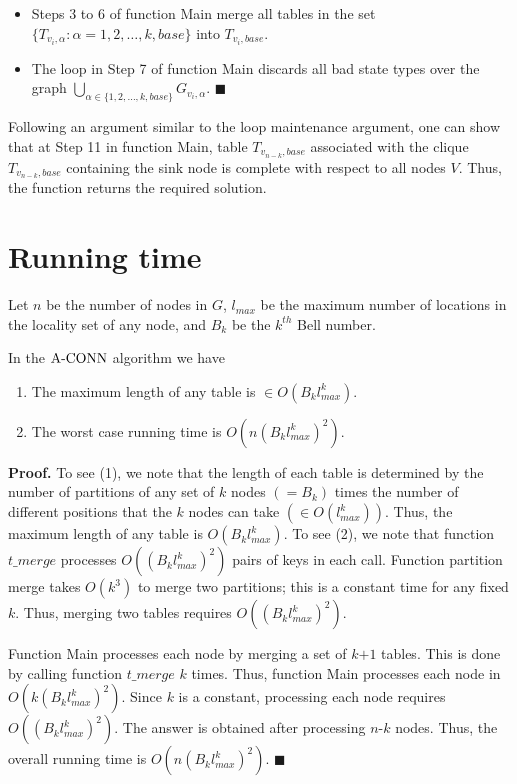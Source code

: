 \begin{itemize}
\item Steps 3 to 6 of function Main merge all tables in the set $\{ T_{v_i,\alpha}:\alpha=1, 2, \ldots, k, base \}$ into $T_{v_i,base}$.
\item The loop in Step 7 of function Main discards all bad state types over the graph $\displaystyle \bigcup_{\alpha\in  \{1, 2, \ldots, k, base\}} G_{v_i,\alpha}$. $\blacksquare$
\end{itemize}

%
Following an argument similar to the loop maintenance argument, one can show that at Step 11 in function Main, table $T_{v_{n-k},base}$ associated with the clique $T_{v_{n-k},base}$ containing the sink node is complete with respect to all nodes $V$.
%
Thus, the function returns the required solution.
\section{Running time}
\label{sec:runtym}
Let $n$ be the number of nodes in $G$, $l_{max}$ be the maximum number of locations in the locality set of any node, and $B_k$ be the $k^{th}$ Bell number.
\nwline 
\begin{theorem}\label{thm:runtym}
\normalfont
In the ${\mathrm {A\mbox{-}CONN}}$ algorithm we have
\begin{enumerate}[noitemsep]
\item The maximum length of any table is $\in O(B_k l_{max}^k)$.
\item The worst case running time is $O(n(B_k l_{max}^k)^2)$.
\end{enumerate}
\end{theorem}
\textbf{Proof.}
\nwline
To see (1), we note that the length of each table is determined by the number of partitions of any set of $k$ nodes $(=B_k)$ times the number of different positions that the $k$ nodes can take $(\in O(l_{max}^k))$. Thus, the maximum length of any table is $O(B_k l_{max}^k)$.
\nwline
To see (2), we note that function $t\_merge$ processes $O((B_k l_{max}^k)^2)$ pairs of keys in each call. Function partition merge takes $O(k^3)$ to merge two partitions; this is a constant time for any fixed $k$. Thus, merging two tables requires $O((B_k l_{max}^k)^2)$. 

Function Main processes each node by merging a set of $k\mbox{+}1$ tables. This is done by calling function $t\_merge$ $k$ times. Thus, function Main processes each node in $O(k(B_k l_{max}^k)^2)$. Since $k$ is a constant, processing each node requires $O((B_k l_{max}^k)^2)$. The answer is obtained after processing $n\mbox{-}k$ nodes. Thus, the overall running time is $O(n(B_k l_{max}^k)^2)$. $\blacksquare$
